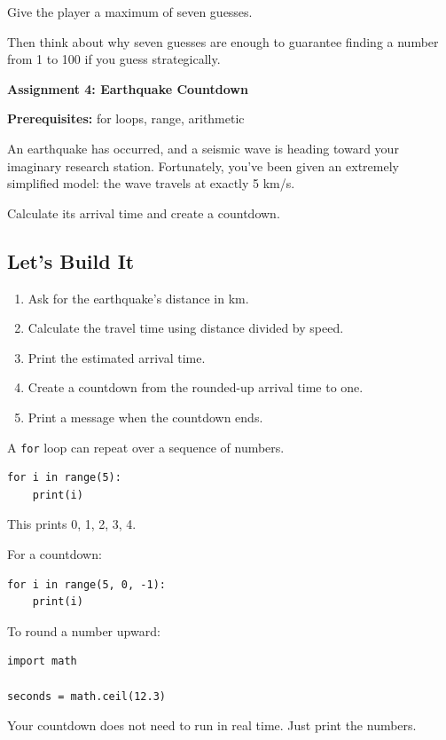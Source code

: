 \documentclass[11pt,letterpaper]{article}
\newcommand{\assignment}[3]{
    \clearpage
    {\Large\bfseries\color{navy} Assignment #1: #2}

    \vspace{2mm}
    {\small\color{darkgray}\textbf{Prerequisites:} #3}

    \vspace{3mm}
}
\newcommand{\steps}{\subsection*{Let's Build It}}
\begin{document}
\begin{challengebox}
Give the player a maximum of seven guesses.

Then think about why seven guesses are enough to guarantee finding a number from 1 to 100 if you guess strategically.
\end{challengebox}

\assignment{4}{Earthquake Countdown}
{for loops, range, arithmetic}

\begin{missionbox}
An earthquake has occurred, and a seismic wave is heading toward your imaginary research station. Fortunately, you've been given an extremely simplified model: the wave travels at exactly 5 km/s. 

Calculate its arrival time and create a countdown.
\end{missionbox}

\steps

\begin{enumerate}
    \item Ask for the earthquake's distance in km.
    \item Calculate the travel time using
    distance divided by speed.
    \item Print the estimated arrival time.
    \item Create a countdown from the rounded-up
    arrival time to one.
    \item Print a message when the countdown ends.
\end{enumerate}

\begin{hintbox}
A \texttt{for} loop can repeat over a sequence
of numbers.

\begin{lstlisting}
for i in range(5):
    print(i)
\end{lstlisting}

This prints 0, 1, 2, 3, 4.

For a countdown:

\begin{lstlisting}
for i in range(5, 0, -1):
    print(i)
\end{lstlisting}

To round a number upward:

\begin{lstlisting}
import math

seconds = math.ceil(12.3)
\end{lstlisting}

Your countdown does not need to run in real time.
Just print the numbers.
\end{hintbox}
\end{document}
